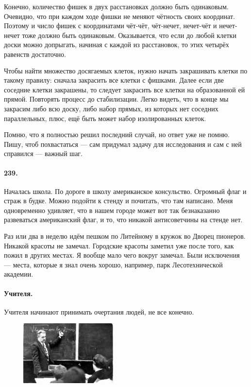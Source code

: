 \documentclass{book}
\begin{document}
Конечно, количество фишек в двух расстановках должно быть одинаковым.
Очевидно, что при каждом ходе фишки не меняют чётность своих координат.
Поэтому и число фишек с координатами чёт-чёт, чёт-нечет, нечет-чёт и нечет-нечет тоже должно быть одинаковым.
Оказывается, что если до любой клетки доски можно допрыгать, начиная с каждой из расстановок, то этих четырёх равенств достаточно.

Чтобы найти множество досягаемых клеток, нужно начать закрашивать клетки по такому правилу:
сначала закрасить все клетки с фишками.
Далее если две соседние клетки закрашены, то следует закрасить все клетки на образованной ей прямой.
Повторять процесс до стабилизации.
Легко видеть, что в конце мы закрасим либо всю доску,
либо набор прямых, из которых нет соседних параллельных, плюс, ещё быть может набор изолированных клеток.

Помню, что я полностью решил последний случай, но ответ уже не помню.
Пишу, чтоб похвастаться --- сам придумал задачу для исследования и сам с ней справился --- важный шаг.

\paragraph{239.}
Началась школа.
По дороге в школу американское консульство.
Огромный флаг и страж в будке.
Можно подойти к стенду и почитать, что там написано.
Меня одновременно удивляет, что в нашем городе может вот так безнаказанно развеваться американский флаг,
и то, что никакой антисоветчины на стенде нет.

Раз или два в неделю идём пешком по 
Литейному в кружок во Дворец пионеров.
Никакой красоты не замечал.
Городские красоты заметил уже после того, как пожил в других местах.
Я вообще мало чего вокруг замечал.
Были исключения --- места, которые я знал очень хорошо, например, парк Лесотехнической академии.

\paragraph{Учителя.}
Учителя начинают принимать очертания людей, 
не все конечно.

\begin{figure}
\vskip-4mm
\centering
\includegraphics[width=49mm,angle=0]{pics/kuksa}
\end{figure}
\end{document}
